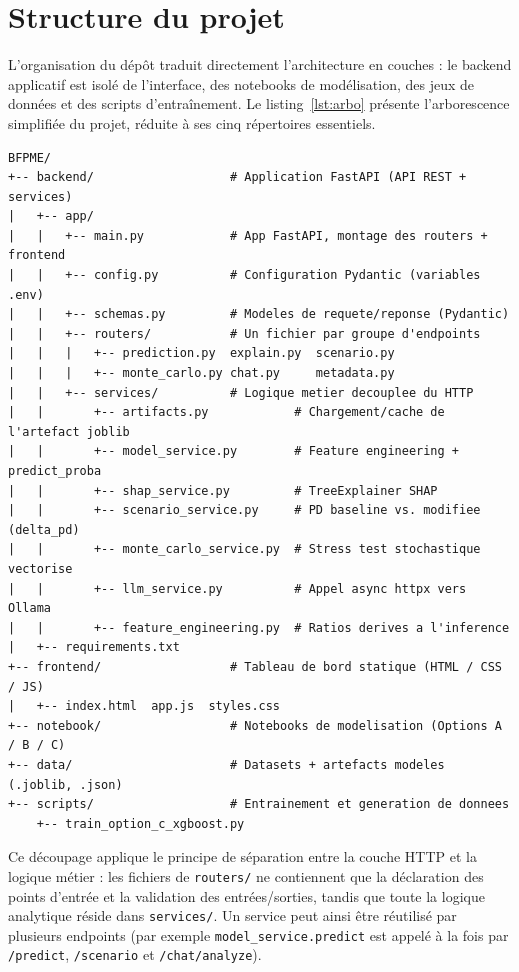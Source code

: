 \documentclass[a4paper,12pt,oneside]{report}
\newenvironment{codeblock}
  {\par\medskip\noindent\begin{minipage}{\linewidth}}
  {\end{minipage}\par\medskip}
\begin{document}
\section{Structure du projet}

L'organisation du dépôt traduit directement l'architecture en couches : le backend
applicatif est isolé de l'interface, des notebooks de modélisation, des jeux de
données et des scripts d'entraînement. Le listing~\ref{lst:arbo} présente
l'arborescence simplifiée du projet, réduite à ses cinq répertoires essentiels.

\begin{codeblock}
\begin{lstlisting}[caption={Arborescence simplifiée du projet}, label={lst:arbo},
                   basicstyle=\ttfamily\scriptsize, columns=fixed, numbers=none]
BFPME/
+-- backend/                   # Application FastAPI (API REST + services)
|   +-- app/
|   |   +-- main.py            # App FastAPI, montage des routers + frontend
|   |   +-- config.py          # Configuration Pydantic (variables .env)
|   |   +-- schemas.py         # Modeles de requete/reponse (Pydantic)
|   |   +-- routers/           # Un fichier par groupe d'endpoints
|   |   |   +-- prediction.py  explain.py  scenario.py
|   |   |   +-- monte_carlo.py chat.py     metadata.py
|   |   +-- services/          # Logique metier decouplee du HTTP
|   |       +-- artifacts.py            # Chargement/cache de l'artefact joblib
|   |       +-- model_service.py        # Feature engineering + predict_proba
|   |       +-- shap_service.py         # TreeExplainer SHAP
|   |       +-- scenario_service.py     # PD baseline vs. modifiee (delta_pd)
|   |       +-- monte_carlo_service.py  # Stress test stochastique vectorise
|   |       +-- llm_service.py          # Appel async httpx vers Ollama
|   |       +-- feature_engineering.py  # Ratios derives a l'inference
|   +-- requirements.txt
+-- frontend/                  # Tableau de bord statique (HTML / CSS / JS)
|   +-- index.html  app.js  styles.css
+-- notebook/                  # Notebooks de modelisation (Options A / B / C)
+-- data/                      # Datasets + artefacts modeles (.joblib, .json)
+-- scripts/                   # Entrainement et generation de donnees
    +-- train_option_c_xgboost.py
\end{lstlisting}
\end{codeblock}

Ce découpage applique le principe de séparation entre la couche HTTP et la
logique métier : les fichiers de \texttt{routers/} ne contiennent que la déclaration
des points d'entrée et la validation des entrées/sorties, tandis que toute la logique
analytique réside dans \texttt{services/}. Un service peut ainsi être réutilisé par
plusieurs endpoints (par exemple \texttt{model\_service.predict} est appelé à la fois
par \texttt{/predict}, \texttt{/scenario} et \texttt{/chat/analyze}).
\end{document}
